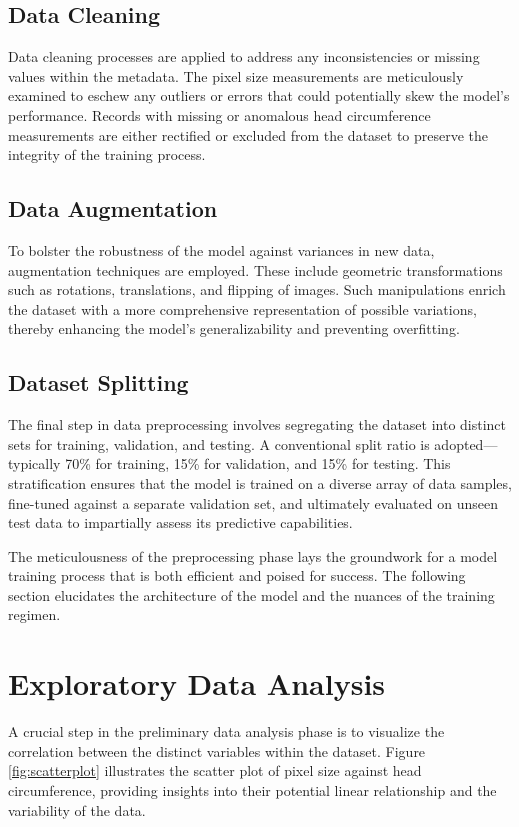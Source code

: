 \documentclass{report}
\begin{document}
\subsection{Data Cleaning}
Data cleaning processes are applied to address any inconsistencies or missing values within the metadata. The pixel size measurements are meticulously examined to eschew any outliers or errors that could potentially skew the model's performance. Records with missing or anomalous head circumference measurements are either rectified or excluded from the dataset to preserve the integrity of the training process.

\subsection{Data Augmentation}
To bolster the robustness of the model against variances in new data, augmentation techniques are employed. These include geometric transformations such as rotations, translations, and flipping of images. Such manipulations enrich the dataset with a more comprehensive representation of possible variations, thereby enhancing the model's generalizability and preventing overfitting.

\subsection{Dataset Splitting}
The final step in data preprocessing involves segregating the dataset into distinct sets for training, validation, and testing. A conventional split ratio is adopted—typically 70\% for training, 15\% for validation, and 15\% for testing. This stratification ensures that the model is trained on a diverse array of data samples, fine-tuned against a separate validation set, and ultimately evaluated on unseen test data to impartially assess its predictive capabilities.

The meticulousness of the preprocessing phase lays the groundwork for a model training process that is both efficient and poised for success. The following section elucidates the architecture of the model and the nuances of the training regimen.

\section{Exploratory Data Analysis}

A crucial step in the preliminary data analysis phase is to visualize the correlation between the distinct variables within the dataset. Figure \ref{fig:scatterplot} illustrates the scatter plot of pixel size against head circumference, providing insights into their potential linear relationship and the variability of the data.
\end{document}
